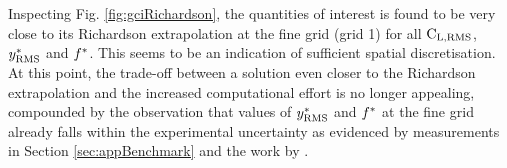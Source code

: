 \documentclass[oneside]{utmthesis}
\begin{document}
Inspecting Fig. \ref{fig:gciRichardson}, the quantities of interest is found to be very close to its Richardson extrapolation at the fine grid (grid 1) for all $\text{C}_{\text{L,RMS}}$, $y^{*}_{\text{RMS}}$ and $f^{*}$. This seems to be an indication of sufficient spatial discretisation. At this point, the trade-off between a solution even closer to the Richardson extrapolation and the increased computational effort is no longer appealing, compounded by the observation that values of $y^{*}_{\text{RMS}}$ and $f^{*}$ at the fine grid already falls within the experimental uncertainty as evidenced by measurements in Section \ref{sec:appBenchmark} and the work by \citet{Koide2013}.


\end{document}
